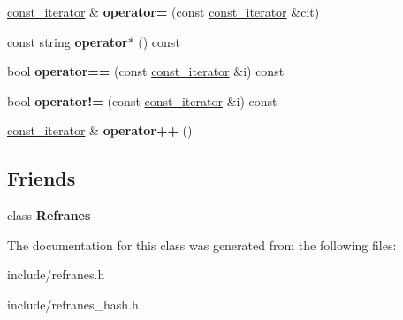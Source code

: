 \begin{DoxyCompactItemize}
\item 
\hyperlink{class_refranes_1_1const__iterator}{const\+\_\+iterator} \& {\bfseries operator=} (const \hyperlink{class_refranes_1_1const__iterator}{const\+\_\+iterator} \&cit)\hypertarget{class_refranes_1_1const__iterator_abb009b92ca81b614e7b9a0c022431c9e}{}\label{class_refranes_1_1const__iterator_abb009b92ca81b614e7b9a0c022431c9e}

\item 
const string {\bfseries operator$\ast$} () const \hypertarget{class_refranes_1_1const__iterator_a98e8196d256d547f9543ed3e4077e023}{}\label{class_refranes_1_1const__iterator_a98e8196d256d547f9543ed3e4077e023}

\item 
bool {\bfseries operator==} (const \hyperlink{class_refranes_1_1const__iterator}{const\+\_\+iterator} \&i) const \hypertarget{class_refranes_1_1const__iterator_af40caead80faac67fe4cffdfd4fce7d9}{}\label{class_refranes_1_1const__iterator_af40caead80faac67fe4cffdfd4fce7d9}

\item 
bool {\bfseries operator!=} (const \hyperlink{class_refranes_1_1const__iterator}{const\+\_\+iterator} \&i) const \hypertarget{class_refranes_1_1const__iterator_a353952aed4bb3f4ebfe3e851ff6922a7}{}\label{class_refranes_1_1const__iterator_a353952aed4bb3f4ebfe3e851ff6922a7}

\item 
\hyperlink{class_refranes_1_1const__iterator}{const\+\_\+iterator} \& {\bfseries operator++} ()\hypertarget{class_refranes_1_1const__iterator_a1c5db7810f0fcb002cae1bade2756296}{}\label{class_refranes_1_1const__iterator_a1c5db7810f0fcb002cae1bade2756296}

\end{DoxyCompactItemize}
\subsection*{Friends}
\begin{DoxyCompactItemize}
\item 
class {\bfseries Refranes}\hypertarget{class_refranes_1_1const__iterator_a7f6877138e51aa5e978647e086657f75}{}\label{class_refranes_1_1const__iterator_a7f6877138e51aa5e978647e086657f75}

\end{DoxyCompactItemize}


The documentation for this class was generated from the following files\+:\begin{DoxyCompactItemize}
\item 
include/refranes.\+h\item 
include/refranes\+\_\+hash.\+h\end{DoxyCompactItemize}
